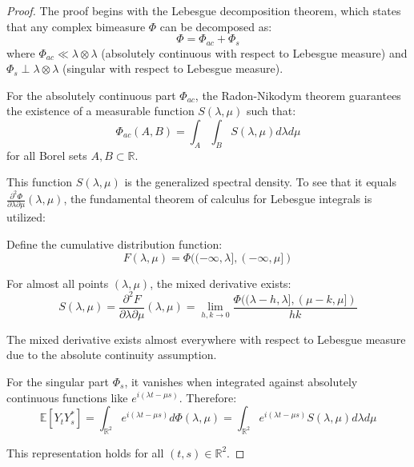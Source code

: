 \documentclass{article}
\theoremstyle{plain}
\theoremstyle{definition}
\begin{document}
\begin{proof}
The proof begins with the Lebesgue decomposition theorem, which states that any complex bimeasure $\Phi$ can be decomposed as:
\begin{equation}
\Phi = \Phi_{ac} + \Phi_{s}
\end{equation}
where $\Phi_{ac} \ll \lambda \otimes \lambda$ (absolutely continuous with respect to Lebesgue measure) and $\Phi_{s} \perp \lambda \otimes \lambda$ (singular with respect to Lebesgue measure).

For the absolutely continuous part $\Phi_{ac}$, the Radon-Nikodym theorem guarantees the existence of a measurable function $S(\lambda,\mu)$ such that:
\begin{equation}
\Phi_{ac}(A, B) = \int_A \int_B S(\lambda,\mu) d\lambda d\mu
\end{equation}
for all Borel sets $A, B \subset \mathbb{R}$.

This function $S(\lambda,\mu)$ is the generalized spectral density. To see that it equals $\frac{\partial^2 \Phi}{\partial \lambda \partial \mu}(\lambda,\mu)$, the fundamental theorem of calculus for Lebesgue integrals is utilized:

Define the cumulative distribution function:
\begin{equation}
F(\lambda, \mu) = \Phi((-\infty, \lambda], (-\infty, \mu])
\end{equation}

For almost all points $(\lambda, \mu)$, the mixed derivative exists:
\begin{equation}
S(\lambda, \mu) = \frac{\partial^2 F}{\partial \lambda \partial \mu}(\lambda, \mu) = \lim_{h,k \to 0} \frac{\Phi((\lambda-h, \lambda], (\mu-k, \mu])}{hk}
\end{equation}

The mixed derivative exists almost everywhere with respect to Lebesgue measure due to the absolute continuity assumption.

For the singular part $\Phi_s$, it vanishes when integrated against absolutely continuous functions like $e^{i(\lambda t-\mu s)}$. Therefore:
\begin{equation}
\mathbb{E}[Y_t Y_s^*] = \int_{\mathbb{R}^2} e^{i(\lambda t - \mu s)} d\Phi(\lambda, \mu) = \int_{\mathbb{R}^2} e^{i(\lambda t - \mu s)} S(\lambda,\mu) d\lambda d\mu
\end{equation}

This representation holds for all $(t,s) \in \mathbb{R}^2$.
\end{proof}
\end{document}
